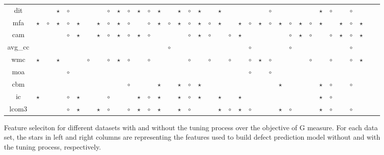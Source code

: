 \begin{figure*}[!ht]
\begin{tabular}{c|c c|c c|c c|c c|c c|c c|c c|c c|c c|c c|c c|c c|c c|c c|c c|c c|c c|c }
dit& & & $\star$& $\circ$& & & & $\circ$& $\star$& $\circ$& $\star$& $\circ$& $\star$& & $\star$& $\circ$& $\star$& & $\star$& & & & & $\circ$& & & & & $\star$& $\circ$& & $\circ$& & \\
mfa& $\star$& $\circ$& $\star$& $\circ$& $\star$& & $\star$& $\circ$& $\star$& $\circ$& & $\circ$& $\star$& $\circ$& $\star$& $\circ$& $\star$& $\circ$& $\star$& & $\star$& $\circ$& $\star$& $\circ$& $\star$& $\circ$& $\star$& $\circ$& $\star$& & $\star$& $\circ$& $\star$& \\
cam& & & & $\circ$& $\star$& & $\star$& $\circ$& $\star$& $\circ$& $\star$& $\circ$& & & & $\circ$& $\star$& $\circ$& & $\circ$& $\star$& & & & & $\circ$& $\star$& $\circ$& & $\circ$& $\star$& $\circ$& $\star$& \\
avg\_cc& & & & & & & & & & & & & & $\circ$& & & & & & & & $\circ$& & & & $\circ$& & & & & & $\circ$& & \\
wmc& $\star$& & $\star$& & & $\circ$& & $\circ$& $\star$& $\circ$& & $\circ$& & & & $\circ$& & $\circ$& & $\circ$& & $\circ$& $\star$& $\circ$& & & & $\circ$& & $\circ$& & $\circ$& $\star$& \\
moa& & & & $\circ$& & & & & & & & & & & & & & & & & & $\circ$& & $\circ$& & & & & & & & & & \\
cbm& & & & & & & & & & $\circ$& & & $\star$& & $\star$& $\circ$& $\star$& & & & & & & & $\star$& & & & $\star$& $\circ$& & $\circ$& & \\
ic& $\star$& & & $\circ$& $\star$& & & $\circ$& & & $\star$& $\circ$& $\star$& & $\star$& $\circ$& $\star$& & $\star$& & $\star$& & & & & & & & $\star$& $\circ$& & & & \\
lcom3& & & & $\circ$& $\star$& & $\star$& $\circ$& & $\circ$& $\star$& $\circ$& $\star$& & $\star$& $\circ$& & & $\star$& $\circ$& $\star$& $\circ$& & & $\star$& $\circ$& & & $\star$& $\circ$& & $\circ$& & \\

  \end{tabular}
    \caption{Feature seleciton for different datasets with and without the tuning process over the objective of G measure. For each data set, the stars in left and right columns are representing the features used to build defect prediction model without and with the tuning process, respectively.}
\end{figure*}



